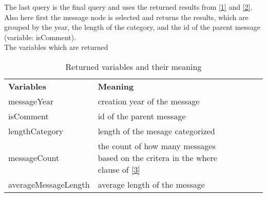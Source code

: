 

The last query is the final query and uses the returned results from \ref{1} and \ref{2}. Also here first the message node is selected and returns the results, which 
are grouped by the year, the length of the category, and the id of the parent message (variable: isComment). \\

The variables which are returned

\begin{table}[!ht]
\begin{tabular}{|l|l|lll}
\cline{1-2}
\textbf{Variables}   & \textbf{Meaning}                                                                  &  &  &  \\ \cline{1-2}
messageYear          & creation year of the message                                                      &  &  &  \\ \cline{1-2}
isComment            & id of the parent message                                                          &  &  &  \\ \cline{1-2}
lengthCategory       & length of the mesage categorized                                                  &  &  &  \\ \cline{1-2}
messageCount         & the count of how many messages based on the critera in the where clause of \ref{3} &  &  &  \\ \cline{1-2}
averageMessageLength & average length of the message                                                     &  &  &  \\ \cline{1-2}
\end{tabular}
\caption{Returned variables and their meaning}
\label{RetCypher1Table}
\end{table}

